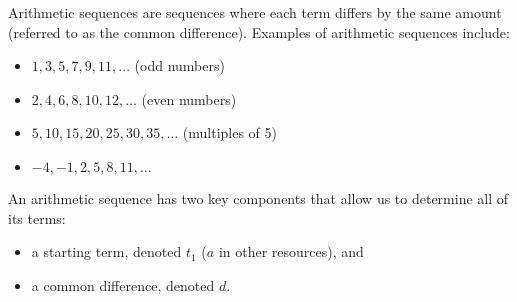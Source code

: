 Arithmetic sequences are sequences where each term differs by the same amount (referred to as the common difference). Examples of arithmetic sequences include:

\begin{itemize}
  \item $1, 3, 5, 7, 9, 11, \dots$ (odd numbers)
  \item $2, 4, 6, 8, 10, 12, \dots$ (even numbers)
  \item $5, 10, 15, 20, 25, 30, 35, \dots$ (multiples of 5)
  \item $-4, -1, 2, 5, 8, 11, \dots$ 
\end{itemize}

An arithmetic sequence has two key components that allow us to determine all of its terms:

\begin{itemize}
  \item a starting term, denoted $t_1$ ($a$ in other resources), and
  \item a common difference, denoted $d$.
\end{itemize}

